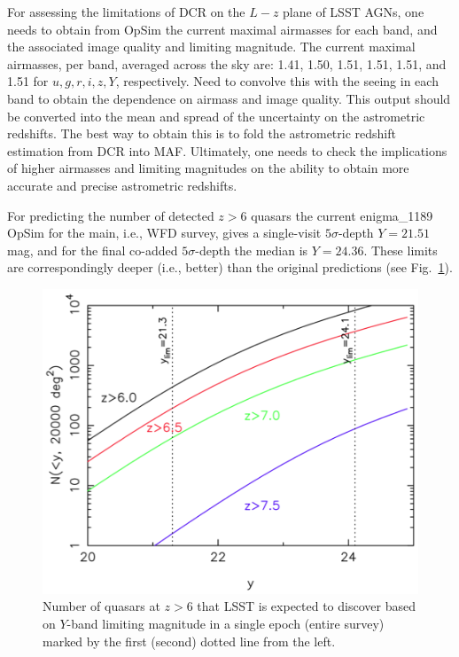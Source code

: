 
For assessing the limitations of DCR on the $L-z$ plane of LSST AGNs,
one needs to obtain from OpSim the current maximal airmasses for each band,
and the associated image quality and limiting magnitude. The current maximal
airmasses, per band, averaged across the sky are: 1.41, 1.50, 1.51, 1.51, 1.51,
and 1.51 for $u, g, r, i, z, Y$, respectively. Need to convolve this with the
seeing in each band to obtain the dependence on airmass and image
quality. This output should be converted into the mean and spread
of the uncertainty on the astrometric redshifts. The best way
to obtain this is to fold the astrometric redshift estimation from
DCR into MAF. Ultimately, one needs to check the implications of higher
airmasses and limiting magnitudes on the ability to obtain more accurate
and precise astrometric redshifts.

For predicting the number of detected $z>6$ quasars
the current enigma\_1189 OpSim for the main, i.e., WFD survey, gives a
single-visit $5\sigma$-depth
$Y=21.51$ mag, and for the final co-added $5\sigma$-depth the median is $Y=24.36$.
These limits are correspondingly deeper (i.e., better) than the original predictions
(see Fig.~\ref{fig:zgt6}).

\begin{figure}
\centering\includegraphics[width=0.9\linewidth]{figs/agn/zgt6_figure_AAS_2013.png}
\caption{Number of quasars at $z>6$ that LSST is expected to discover
based on $Y$-band limiting magnitude in a single epoch (entire survey)
marked by the first (second) dotted line from the left.}
\label{fig:zgt6}
\end{figure}

